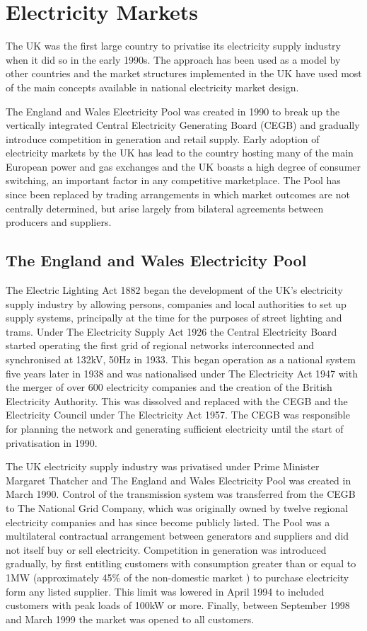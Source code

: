 \section{Electricity Markets}
The UK was the first large country to privatise its electricity supply industry
when it did so in the early 1990s.  The approach has been used as a model
by other countries and the market structures implemented in the UK have used
most of the main concepts available in national electricity market design.

The England and Wales Electricity Pool was created in 1990 to break up the
vertically integrated Central Electricity Generating Board (CEGB) and
gradually introduce competition in generation and retail supply.  Early
adoption of electricity markets by the UK has lead to the country hosting many
of the main European power and gas exchanges and the UK boasts a high degree
of consumer switching, an important factor in any competitive marketplace.  The
Pool has since been replaced by trading arrangements in which market outcomes
are not centrally determined, but arise largely from bilateral agreements
between producers and suppliers.

\subsection{The England and Wales Electricity Pool}
\label{sec:thepool}
The Electric Lighting Act 1882 began the development of the UK's electricity
supply industry by allowing persons, companies and local authorities to set up
supply systems, principally at the time for the purposes of street lighting and
trams.  Under The Electricity Supply Act 1926 the Central Electricity Board
started operating the first grid of regional networks interconnected and
synchronised at 132kV, 50Hz in 1933.  This began operation as a national system
five years later in 1938 and was nationalised under The Electricity Act 1947
with the merger of over 600 electricity companies and the creation of the
British Electricity Authority.  This was dissolved and replaced with the
CEGB and the Electricity Council under The Electricity Act 1957.  The CEGB was
responsible for planning the network and generating sufficient electricity until the start of privatisation in 1990.

The UK electricity supply industry was privatised under Prime Minister
Margaret Thatcher and The England and Wales Electricity Pool was created in
March 1990.  Control of the transmission system was transferred from the
CEGB to The National Grid Company, which was originally owned by twelve
regional electricity companies and has since become publicly listed.  The
Pool was a multilateral contractual arrangement between generators and suppliers and did
not itself buy or sell electricity.  Competition in generation was introduced
gradually, by first entitling customers with consumption greater than or equal
to 1MW (approximately 45\% of the non-domestic market \cite{decc:dukes09}) to
purchase electricity form any listed supplier.  This limit was lowered in April
1994 to included customers with peak loads of 100kW or more.  Finally, between
September 1998 and March 1999 the market was opened to all customers.

